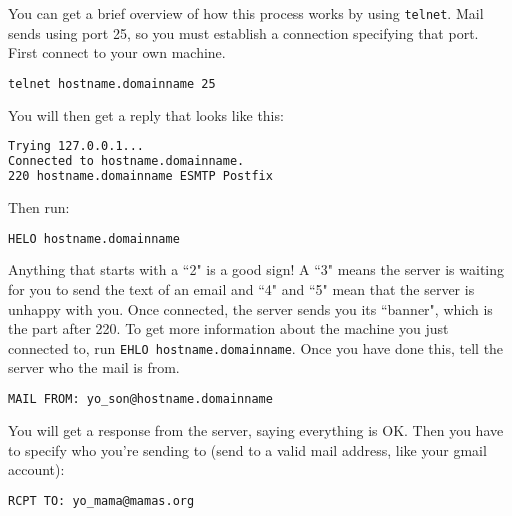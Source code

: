 \documentclass{article}
\begin{document}
\indent\indent You can get a brief overview of how this process works by using \verb|telnet|. Mail sends using port 25, so you must establish a connection specifying that port. First connect to your own machine.

\begin{lstlisting}[basicstyle=\ttfamily, backgroundcolor = \color{lightgray}, language = bash, xleftmargin = 0cm, framexleftmargin = 1em]
telnet hostname.domainname 25
\end{lstlisting}

You will then get a reply that looks like this:

\begin{lstlisting}[basicstyle=\ttfamily, backgroundcolor = \color{lightgray}, language = bash, xleftmargin = 0cm, framexleftmargin = 1em]
Trying 127.0.0.1...
Connected to hostname.domainname.
220 hostname.domainname ESMTP Postfix
\end{lstlisting}

Then run: 

\begin{lstlisting}[basicstyle=\ttfamily, backgroundcolor = \color{lightgray}, language = bash, xleftmargin = 0cm, framexleftmargin = 1em]
HELO hostname.domainname 
\end{lstlisting}

Anything that starts with a ``2" is a good sign! A ``3" means the server is waiting for you to send the text of an email and ``4" and ``5" mean that the server is unhappy with you. Once connected, the server sends you its ``banner", which is the part after 220. To get more information about the machine you just connected to, run \verb|EHLO hostname.domainname|. Once you have done this, tell the server who the mail is from. 

\begin{lstlisting}[basicstyle=\ttfamily, backgroundcolor = \color{lightgray}, language = bash, xleftmargin = 0cm, framexleftmargin = 1em]
MAIL FROM: yo_son@hostname.domainname
\end{lstlisting}
You will get a response from the server, saying everything is OK. Then you have to specify who you're sending to (send to a valid mail address, like your gmail account):

\begin{lstlisting}[basicstyle=\ttfamily, backgroundcolor = \color{lightgray}, language = bash, xleftmargin = 0cm, framexleftmargin = 1em]
RCPT TO: yo_mama@mamas.org
\end{lstlisting}
\end{document}
